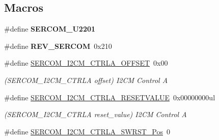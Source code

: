 \subsection*{Macros}
\begin{DoxyCompactItemize}
\item 
\hypertarget{group___s_a_m_l21___s_e_r_c_o_m_gae9efb26eaf850e0125bb89b1c0e072dc}{}\#define {\bfseries S\+E\+R\+C\+O\+M\+\_\+\+U2201}\label{group___s_a_m_l21___s_e_r_c_o_m_gae9efb26eaf850e0125bb89b1c0e072dc}

\item 
\hypertarget{group___s_a_m_l21___s_e_r_c_o_m_ga95bc71ffa6449bc7e3c9a4bab1eecfe3}{}\#define {\bfseries R\+E\+V\+\_\+\+S\+E\+R\+C\+O\+M}~0x210\label{group___s_a_m_l21___s_e_r_c_o_m_ga95bc71ffa6449bc7e3c9a4bab1eecfe3}

\item 
\hypertarget{group___s_a_m_l21___s_e_r_c_o_m_gaf2ddd5fe6e8a96fab454c5c133f81044}{}\#define \hyperlink{group___s_a_m_l21___s_e_r_c_o_m_gaf2ddd5fe6e8a96fab454c5c133f81044}{S\+E\+R\+C\+O\+M\+\_\+\+I2\+C\+M\+\_\+\+C\+T\+R\+L\+A\+\_\+\+O\+F\+F\+S\+E\+T}~0x00\label{group___s_a_m_l21___s_e_r_c_o_m_gaf2ddd5fe6e8a96fab454c5c133f81044}

\begin{DoxyCompactList}\small\item\em (S\+E\+R\+C\+O\+M\+\_\+\+I2\+C\+M\+\_\+\+C\+T\+R\+L\+A offset) I2\+C\+M Control A \end{DoxyCompactList}\item 
\hypertarget{group___s_a_m_l21___s_e_r_c_o_m_gac9b8ab7883578c82daa4f8113f1078c9}{}\#define \hyperlink{group___s_a_m_l21___s_e_r_c_o_m_gac9b8ab7883578c82daa4f8113f1078c9}{S\+E\+R\+C\+O\+M\+\_\+\+I2\+C\+M\+\_\+\+C\+T\+R\+L\+A\+\_\+\+R\+E\+S\+E\+T\+V\+A\+L\+U\+E}~0x00000000ul\label{group___s_a_m_l21___s_e_r_c_o_m_gac9b8ab7883578c82daa4f8113f1078c9}

\begin{DoxyCompactList}\small\item\em (S\+E\+R\+C\+O\+M\+\_\+\+I2\+C\+M\+\_\+\+C\+T\+R\+L\+A reset\+\_\+value) I2\+C\+M Control A \end{DoxyCompactList}\item 
\hypertarget{group___s_a_m_l21___s_e_r_c_o_m_ga32388e778d6020a6fe2fbb8d2d0a6221}{}\#define \hyperlink{group___s_a_m_l21___s_e_r_c_o_m_ga32388e778d6020a6fe2fbb8d2d0a6221}{S\+E\+R\+C\+O\+M\+\_\+\+I2\+C\+M\+\_\+\+C\+T\+R\+L\+A\+\_\+\+S\+W\+R\+S\+T\+\_\+\+Pos}~0\label{group___s_a_m_l21___s_e_r_c_o_m_ga32388e778d6020a6fe2fbb8d2d0a6221}


\end{DoxyCompactItemize}
